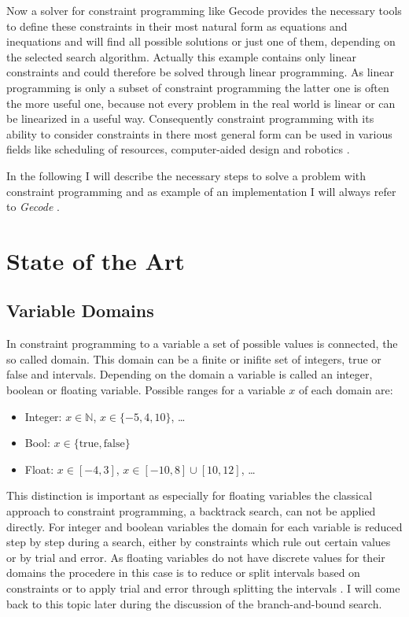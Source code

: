 \documentclass[10pt,
               a4paper,
               journal,
               ]{IEEEtran}
\begin{document}
	Now a solver for constraint programming like Gecode provides the necessary tools to define these constraints in their most natural form as equations and inequations and will find all possible solutions or just one of them, depending on the selected search algorithm. Actually this example contains only linear constraints and could therefore be solved through linear programming. As linear programming is only a subset of constraint programming the latter one is often the more useful one, because not every problem in the real world is linear or can be linearized in a useful way. Consequently constraint programming with its ability to consider constraints in there most general form can be used in various fields like scheduling of resources, computer-aided design and robotics \cite[p. 221]{trendsInCP}.
	
	In the following I will describe the necessary steps to solve a problem with constraint programming and as example of an implementation I will always refer to \emph{Gecode} \cite{gecode}.
	
	\section{State of the Art}
	\subsection{Variable Domains}
	In constraint programming to a variable a set of possible values is connected, the so called domain. This domain can be a finite or inifite set of integers, true or false and intervals. Depending on the domain a variable is called an integer, boolean or floating variable. Possible ranges for a variable $x$ of each domain are:
	\begin{itemize}
		\item Integer: $x \in \mathbb{N}$, $x \in \{-5, 4, 10\}$, \dots
		\item Bool: $x \in \{\text{true}, \text{false}\}$
		\item Float: $x \in [-4, 3]$, $x \in [-10, 8] \cup [10, 12]$, \dots
	\end{itemize}
	This distinction is important as especially for floating variables the classical approach to constraint programming, a backtrack search, can not be applied directly. For integer and boolean variables the domain for each variable is reduced step by step during a search, either by constraints which rule out certain values or by trial and error. As floating variables do not have discrete values for their domains the procedere in this case is to reduce or split intervals based on constraints or to apply trial and error through splitting the intervals \cite[p. 571]{handbookCP}. I will come back to this topic later during the discussion of the branch-and-bound search.
	
\end{document}
